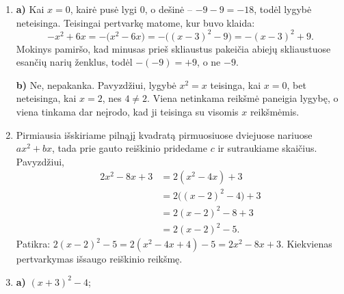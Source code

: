 \documentclass[12pt,a4paper]{article}
\begin{document}
\begin{enumerate}
\textbf{i)} $-x^2+5x=-(x^2-5x)=-\bigl((x-\frac52)^2-\frac{25}{4}\bigr)=-(x-\frac52)^2+\frac{25}{4}$.

\textbf{j)} Iškeliame $4$ ir skliaustuose išskiriame pilnąjį kvadratą:
\[
4x^2+bx=4\left(x^2+\frac b4x\right)
=4\left[\left(x+\frac b8\right)^2-\frac{b^2}{64}\right]
=4\left(x+\frac b8\right)^2-\frac{b^2}{16}.
\]
\textbf{k)} Iškeliame $3$; skliaustuose koeficientas prie $x$ yra $-\frac b3$:
\[
3x^2-bx=3\left(x^2-\frac b3x\right)
=3\left[\left(x-\frac b6\right)^2-\frac{b^2}{36}\right]
=3\left(x-\frac b6\right)^2-\frac{b^2}{12}.
\]
\textbf{l)} Kai $a\ne0$,
\[
ax^2+2x=a\left(x^2+\frac2a x\right)
=a\left[\left(x+\frac1a\right)^2-\frac1{a^2}\right]
=a\left(x+\frac1a\right)^2-\frac1a.
\]
\textbf{m)} Kai $a\ne0$,
\[
ax^2-3x=a\left(x^2-\frac3a x\right)
=a\left[\left(x-\frac3{2a}\right)^2-\frac9{4a^2}\right]
=a\left(x-\frac3{2a}\right)^2-\frac9{4a}.
\]
\textbf{n)} Kai $a\ne0$,
\[
ax^2+bx=a\left(x^2+\frac ba x\right)
=a\left[\left(x+\frac b{2a}\right)^2-\frac{b^2}{4a^2}\right]
=a\left(x+\frac b{2a}\right)^2-\frac{b^2}{4a}.
\]
Patikra: atskliaudus paskutinį užrašą gauname
\[
a\left(x+\frac b{2a}\right)^2-\frac{b^2}{4a}
=ax^2+bx+\frac{b^2}{4a}-\frac{b^2}{4a}=ax^2+bx.
\]
\item \textbf{a)} Kai $x=0$, kairė pusė lygi $0$, o dešinė – $-9-9=-18$, todėl lygybė neteisinga. Teisingai pertvarkę matome, kur buvo klaida:
\[
-x^2+6x=-\bigl(x^2-6x\bigr)=-\bigl((x-3)^2-9\bigr)=-(x-3)^2+9.
\]
Mokinys pamiršo, kad minusas prieš skliaustus pakeičia abiejų skliaustuose esančių narių ženklus, todėl $-(-9)=+9$, o ne $-9$.

\textbf{b)} Ne, nepakanka. Pavyzdžiui, lygybė $x^2=x$ teisinga, kai $x=0$, bet neteisinga, kai $x=2$, nes $4\ne2$. Viena netinkama reikšmė paneigia lygybę, o viena tinkama dar neįrodo, kad ji teisinga su visomis $x$ reikšmėmis.
\item Pirmiausia išskiriame pilnąjį kvadratą pirmuosiuose dviejuose nariuose $ax^2+bx$, tada prie gauto reiškinio pridedame $c$ ir sutraukiame skaičius. Pavyzdžiui,
\[
\begin{aligned}
2x^2-8x+3&=2(x^2-4x)+3\\
&=2\bigl((x-2)^2-4\bigr)+3\\
&=2(x-2)^2-8+3\\
&=2(x-2)^2-5.
\end{aligned}
\]
Patikra: $2(x-2)^2-5=2(x^2-4x+4)-5=2x^2-8x+3$. Kiekvienas pertvarkymas išsaugo reiškinio reikšmę.
\item \textbf{a)} $(x+3)^2-4$;


\end{enumerate}
\end{document}
